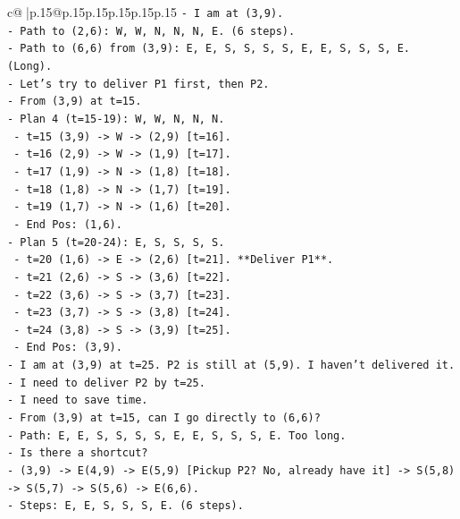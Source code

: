 \documentclass{article}
\begin{document}
{\begin{supertabular}{c@{$\;$}|p{.15\linewidth}@{}p{.15\linewidth}p{.15\linewidth}p{.15\linewidth}p{.15\linewidth}p{.15\linewidth}}
{{{\texttt{{-} I am at (3,9).} \\
\texttt{{-} Path to (2,6): W, W, N, N, N, E. (6 steps).} \\
\texttt{{-} Path to (6,6) from (3,9): E, E, S, S, S, S, E, E, S, S, S, E. (Long).} \\
\texttt{{-} Let's try to deliver P1 first, then P2.} \\
\texttt{{-} From (3,9) at t=15.} \\
\texttt{{-} Plan 4 (t=15{-}19): W, W, N, N, N.} \\
\texttt{  {-} t=15 (3,9) {-}> W {-}> (2,9) {[}t=16{]}.} \\
\texttt{  {-} t=16 (2,9) {-}> W {-}> (1,9) {[}t=17{]}.} \\
\texttt{  {-} t=17 (1,9) {-}> N {-}> (1,8) {[}t=18{]}.} \\
\texttt{  {-} t=18 (1,8) {-}> N {-}> (1,7) {[}t=19{]}.} \\
\texttt{  {-} t=19 (1,7) {-}> N {-}> (1,6) {[}t=20{]}.} \\
\texttt{  {-} End Pos: (1,6).} \\
\texttt{{-} Plan 5 (t=20{-}24): E, S, S, S, S.} \\
\texttt{  {-} t=20 (1,6) {-}> E {-}> (2,6) {[}t=21{]}. **Deliver P1**.} \\
\texttt{  {-} t=21 (2,6) {-}> S {-}> (3,6) {[}t=22{]}.} \\
\texttt{  {-} t=22 (3,6) {-}> S {-}> (3,7) {[}t=23{]}.} \\
\texttt{  {-} t=23 (3,7) {-}> S {-}> (3,8) {[}t=24{]}.} \\
\texttt{  {-} t=24 (3,8) {-}> S {-}> (3,9) {[}t=25{]}.} \\
\texttt{  {-} End Pos: (3,9).} \\
\texttt{{-} I am at (3,9) at t=25. P2 is still at (5,9). I haven't delivered it.} \\
\texttt{{-} I need to deliver P2 by t=25.} \\
\texttt{{-} I need to save time.} \\
\texttt{{-} From (3,9) at t=15, can I go directly to (6,6)?} \\
\texttt{{-} Path: E, E, S, S, S, S, E, E, S, S, S, E. Too long.} \\
\texttt{{-} Is there a shortcut?} \\
\texttt{{-} (3,9) {-}> E(4,9) {-}> E(5,9) {[}Pickup P2? No, already have it{]} {-}> S(5,8) {-}> S(5,7) {-}> S(5,6) {-}> E(6,6).} \\
\texttt{{-} Steps: E, E, S, S, S, E. (6 steps).} \\
}}}
\end{supertabular}}
\end{document}
